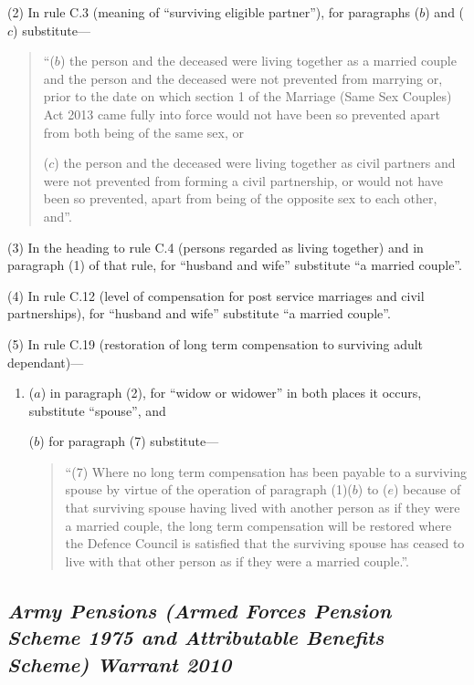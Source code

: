 \documentclass[12pt,a4paper]{article}
\begin{document}
(2) In rule C.3 (meaning of “surviving eligible partner”), for paragraphs ($b$)  and ($c$)  substitute—
\begin{quotation}
“($b$) the person and the deceased were living together as a married couple and the person and the deceased were not prevented from marrying or, prior to the date on which section 1 of the Marriage (Same Sex Couples) Act 2013 came fully into force would not have been so prevented apart from both being of the same sex, or

($c$) the person and the deceased were living together as civil partners and were not prevented from forming a civil partnership, or would not have been so prevented, apart from being of the opposite sex to each other, and”.
\end{quotation}

(3) In the heading to rule C.4 (persons regarded as living together) and in paragraph (1) of that rule, for “husband and wife” substitute “a married couple”.

(4) In rule C.12 (level of compensation for post service marriages and civil partnerships), for “husband and wife” substitute “a married couple”.

(5) In rule C.19 (restoration of long term compensation to surviving adult dependant)—
\begin{enumerate}\item[]
($a$) in paragraph (2), for “widow or widower” in both places it occurs, substitute “spouse”, and

($b$) for paragraph (7) substitute—
\begin{quotation}
“(7) Where no long term compensation has been payable to a surviving spouse by virtue of the operation of paragraph (1)($b$)  to ($e$)  because of that surviving spouse having lived with another person as if they were a married couple, the long term compensation will be restored where the Defence Council is satisfied that the surviving spouse has ceased to live with that other person as if they were a married couple.”.
\end{quotation}
\end{enumerate}

\subsection*{\itshape Army Pensions (Armed Forces Pension Scheme 1975 and Attributable Benefits Scheme) Warrant 2010}
\end{document}

